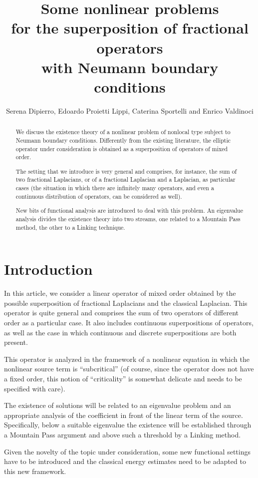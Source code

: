 \documentclass[12pt,a4paper,intlimits,sumlimits]{amsart}
\title[Superposition of operators with Neumann conditions]{Some nonlinear problems\\
for the superposition of fractional operators\\ with Neumann boundary conditions}
\author[S. Dipierro, E. Proietti Lippi, C. Sportelli and E. Valdinoci]{Serena Dipierro, Edoardo Proietti Lippi, Caterina Sportelli and Enrico Valdinoci}
\theoremstyle{definition}
\theoremstyle{plain}
\numberwithin{equation}{section}
\begin{document}
\maketitle

\begin{abstract}
We discuss the existence theory of a nonlinear problem of nonlocal type subject to Neumann boundary conditions. Differently from the existing literature, the elliptic operator under consideration is obtained as a superposition of operators of mixed order.

The setting that we introduce is very general and comprises, for instance, the sum of two fractional Laplacians, or of a fractional Laplacian and a Laplacian, as particular cases
(the situation in which there are infinitely many operators, and even a continuous distribution of operators, can be considered as well).

New bits of functional analysis are introduced to deal with this problem. An eigenvalue analysis divides the existence theory into two streams, one related to a Mountain Pass method, the other to a Linking technique.
\end{abstract}

\tableofcontents

\section{Introduction}
In this article, we consider a linear operator of mixed order obtained by the possible superposition of fractional Laplacians and the classical Laplacian. This operator is quite general and comprises the sum of two operators
of different order as a particular case. It also includes continuous superpositions of operators, as well as the case in which continuous and discrete superpositions are both present.

This operator is analyzed in the framework of a nonlinear equation in which the nonlinear source term is ``subcritical'' (of course, since the operator does not have a fixed order, this notion of ``criticality'' is somewhat delicate and needs to be specified with care).

The existence of solutions will be related to an eigenvalue problem and an appropriate analysis of the coefficient in front of the linear term of the source. Specifically, below a suitable eigenvalue the existence will be established through a Mountain Pass argument and above such a threshold by a Linking method.

Given the novelty of the topic under consideration, some new functional settings have to be introduced and the classical energy estimates need to be adapted to this new framework.
\medskip
\end{document}
